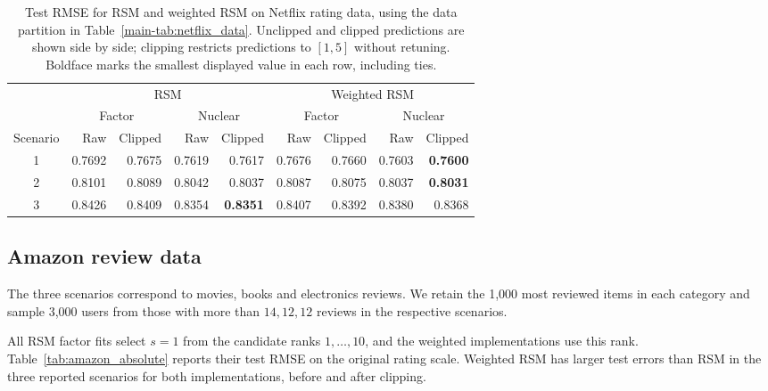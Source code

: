 \documentclass[numsec,webpdf,modern,large,namedate]{oup-authoring-template}
\theoremstyle{plain}
\theoremstyle{remark}
\newif\ifmarkchanges
\newenvironment{revision}{\begingroup\ifmarkchanges\color{red}\fi}{\endgroup}
\begin{document}
\begin{table}[!htbp]
\centering
\caption{Test RMSE for RSM and weighted RSM on Netflix rating data, using the data partition in Table~\ref{main-tab:netflix_data}. Unclipped and clipped predictions are shown side by side; clipping restricts predictions to $[1,5]$ without retuning. Boldface marks the smallest displayed value in each row, including ties.}
\label{tab:netflix_absolute}
\begingroup
\small
{}
\setlength{\tabcolsep}{4pt}
\begin{tabular}{@{}crrrrrrrr@{}}
\toprule
 & \multicolumn{4}{c}{RSM} & \multicolumn{4}{c}{Weighted RSM} \\
\cmidrule(lr){2-5}\cmidrule(lr){6-9}
 & \multicolumn{2}{c}{Factor} & \multicolumn{2}{c}{Nuclear} & \multicolumn{2}{c}{Factor} & \multicolumn{2}{c}{Nuclear} \\
\cmidrule(lr){2-3}\cmidrule(lr){4-5}\cmidrule(lr){6-7}\cmidrule(lr){8-9}
Scenario & Raw & Clipped & Raw & Clipped & Raw & Clipped & Raw & Clipped \\
\midrule
1 & 0.7692 & 0.7675 & 0.7619 & 0.7617 & 0.7676 & 0.7660 & 0.7603 & \textbf{0.7600} \\
2 & 0.8101 & 0.8089 & 0.8042 & 0.8037 & 0.8087 & 0.8075 & 0.8037 & \textbf{0.8031} \\
3 & 0.8426 & 0.8409 & 0.8354 & \textbf{0.8351} & 0.8407 & 0.8392 & 0.8380 & 0.8368 \\
\bottomrule
\end{tabular}
\endgroup
\end{table}

\begin{revision}
\subsection{Amazon review data}
The three scenarios correspond to movies, books and electronics reviews. We retain the 1,000 most reviewed items in each category and sample 3,000 users from those with more than $14,12,12$ reviews in the respective scenarios.

All RSM factor fits select $s=1$ from the candidate ranks $1,\ldots,10$, and the weighted implementations use this rank. Table~\ref{tab:amazon_absolute} reports their test RMSE on the original rating scale. Weighted RSM has larger test errors than RSM in the three reported scenarios for both implementations, before and after clipping.

\end{revision}
\end{document}
